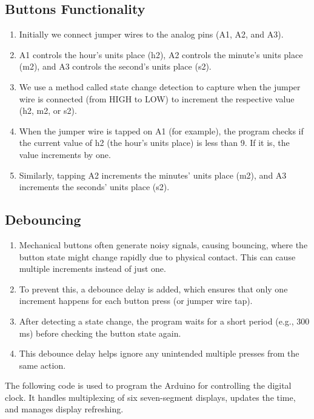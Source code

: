 \documentclass[journal]{IEEEtran}
\begin{document}
\subsection{Buttons Functionality}
\begin{enumerate}
    \item Initially we connect jumper wires to the analog pins (A1, A2, and A3).
    \item A1 controls the hour's units place (h2), A2 controls the minute's units place (m2), and A3 controls the second's units place (s2).
    \item We use a method called state change detection to capture when the jumper wire is connected (from HIGH to LOW) to increment the respective value (h2, m2, or s2).
    \item When the jumper wire is tapped on A1 (for example), the program checks if the current value of h2 (the hour's units place) is less than 9. If it is, the value increments by one.
    \item Similarly, tapping A2 increments the minutes' units place (m2), and A3 increments the seconds' units place (s2).
\end{enumerate}

\subsection{Debouncing}
\begin{enumerate}
    \item Mechanical buttons often generate noisy signals, causing bouncing, where the button state might change rapidly due to physical contact. This can cause multiple increments instead of just one.
    \item To prevent this, a debounce delay is added, which ensures that only one increment happens for each button press (or jumper wire tap).
    \item After detecting a state change, the program waits for a short period (e.g., 300 ms) before checking the button state again.
    \item This debounce delay helps ignore any unintended multiple presses from the same action.
\end{enumerate}

\newpage
The following code is used to program the Arduino for controlling the digital clock. It handles multiplexing of six seven-segment displays, updates the time, and manages display refreshing.\\
\end{document}

